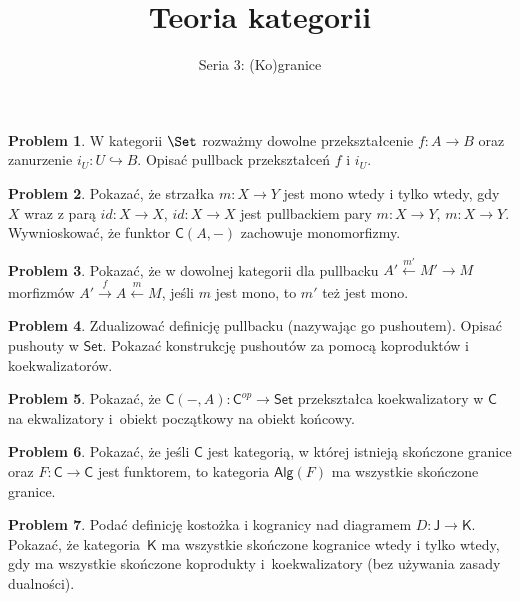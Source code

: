 \documentclass[10pt]{amsart}
\title{Teoria kategorii}
\author{Seria 3: (Ko)granice}
\theoremstyle{plain}
\theoremstyle{definition}
\newtheorem{problem}{Problem}
\numberwithin{equation}{section}
\begin{document}
\maketitle
\thispagestyle{empty}

\begin{problem}
W kategorii $\Set$ rozważmy dowolne przekształcenie $f\colon A\to B$ oraz zanurzenie $i_U\colon U\hookrightarrow B$. Opisać pullback przekształceń $f$ i $i_U$.
\end{problem}


\begin{problem}
Pokazać, że strzałka $m:X\to Y$ jest mono wtedy i tylko wtedy, gdy $X$ wraz z parą $id:X\to X$, $id:X\to X$ jest pullbackiem pary $m:X\to Y$, $m:X\to Y$. Wywnioskować, że funktor $\mathsf{C}(A,-)$ zachowuje monomorfizmy.
\end{problem}

\begin{problem}
Pokazać, że w dowolnej kategorii dla pullbacku  $A'\stackrel{m'}{\leftarrow} M'\rightarrow M$ morfizmów $A'\stackrel{f}{\rightarrow } A\stackrel{m}{\leftarrow }M$, jeśli $m$ jest mono, to $m'$ też jest mono. 
\end{problem}

\begin{problem}
Zdualizować definicję pullbacku (nazywając go pushoutem). Opisać pushouty w $\mathsf{Set}$. Pokazać konstrukcję pushoutów za pomocą koproduktów i koekwalizatorów. 
\end{problem}

\begin{problem}
Pokazać, że $\mathsf{C}(-,A):\mathsf{C}^{op}\to \mathsf{Set}$ przekształca koekwalizatory w $\mathsf{C}$ na ekwalizatory i~obiekt początkowy na obiekt końcowy.
\end{problem}

\begin{problem}
Pokazać, że jeśli $\mathsf{C}$ jest kategorią, w której istnieją skończone granice oraz $F:\mathsf{C}\to \mathsf{C}$ jest funktorem, to kategoria $\mathsf{Alg}(F)$ ma wszystkie skończone granice. 
\end{problem}


\begin{problem}
Podać definicję kostożka i kogranicy nad diagramem $D:\mathsf{J}\to \mathsf{K}$. Pokazać, że kategoria~$\mathsf{K}$ ma wszystkie skończone kogranice wtedy i tylko wtedy, gdy ma wszystkie skończone koprodukty i~koekwalizatory (bez używania zasady dualności). 
\end{problem}
\end{document}
